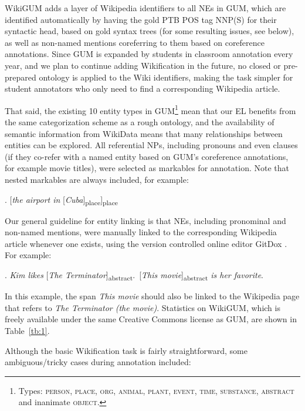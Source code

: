 \documentclass[11pt,a4paper]{article}
\begin{document}
WikiGUM adds a layer of Wikipedia identifiers to all NEs in GUM, which are identified automatically by having the gold PTB POS tag NNP(S) for their syntactic head, based on gold syntax trees (for some resulting issues, see below), as well as non-named mentions coreferring to them based on coreference annotations. Since GUM is expanded by students in classroom annotation every year, and we plan to continue adding Wikification in the future, no closed or pre-prepared ontology is applied to the Wiki identifiers, making the task simpler for student annotators who only need to find a corresponding Wikipedia article.

That said, the existing 10 entity types in GUM\footnote{Types: \textsc{person, place, org, animal, plant, event, time, substance, abstract} and inanimate \textsc{object}.} mean that our EL benefits from the same categorization scheme as a rough ontology, and the availability of semantic information from WikiData means that many relationships between entities can be explored. All referential NPs, including pronouns and even clauses (if they co-refer with a named entity based on GUM's coreference annotations, for example movie titles), were selected as markables for annotation. Note that nested markables are always included, for example: 

\ex. [\textit{the airport in} [\textit{Cuba}]\textsubscript{place}]\textsubscript{place}

Our general guideline for entity linking is that NEs, including  pronominal and non-named mentions, were manually linked to the corresponding Wikipedia article whenever one exists, using the version controlled online editor GitDox \cite{zhang2017gitdox}. For example: 

\ex. \textit{Kim likes} [\textit{The Terminator}]\textsubscript{abstract}.~[\textit{This movie}]\textsubscript{abstract} \textit{is her favorite}.

In this example, the span \textit{This movie} should also be linked to the Wikipedia page that refers to \textit{The Terminator (the movie)}. Statistics on WikiGUM, which is freely available under the same Creative Commons license as GUM, are shown in Table~\ref{tb:1}.\par

Although the basic Wikification task is fairly straightforward, some ambiguous/tricky cases during annotation included:
\end{document}
